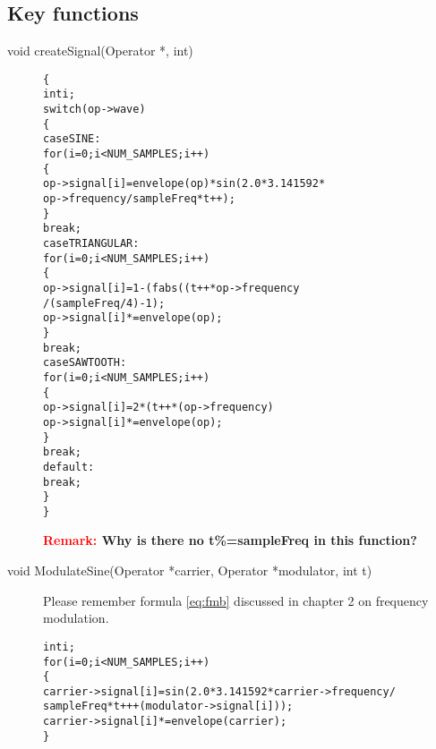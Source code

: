 \subsection{Key functions}
\begin{description}
\item[void createSignal(Operator *, int)] \label{code:createSignal}
\begin{alltt}
\{
	   int i;
	   switch(op->wave)
	   \{	
	   case SINE:
		      for(i=0; i<NUM_SAMPLES; i++)
		      \{
	            op->signal[i] = envelope(op) * sin( 2.0 * 3.141592 * 
	      		   				          op->frequency / sampleFreq * t++ );
		      \}
		      break;
	   case TRIANGULAR:
		      for(i=0; i<NUM_SAMPLES; i++)
		      \{
	            op->signal[i] = 1-(fabs((t++*op->frequency%sampleFreq)-sampleFreq/2)
	                         / (sampleFreq/4)  - 1 );
	            op->signal[i] *= envelope(op);
		      \}
		      break;
	   case SAWTOOTH:
		      for(i=0; i<NUM_SAMPLES; i++)
		      \{
	            op->signal[i] = 2*( t++*(op->frequency)%sampleFreq )/sampleFreq - 1;
	            op->signal[i] *= envelope(op);
		      \}
		      break;		
	   default:
		      break;
	   \}		
\}

\end{alltt}

\textbf{\textcolor{red}{Remark:} Why is there no t\%=sampleFreq in this function?} \\ 
\item[void ModulateSine(Operator *carrier, Operator *modulator, int t)] Please remember formula \ref{eq:fmb} discussed in chapter 2 on frequency modulation. 
\begin{alltt}
   int i;
   for(i=0; i<NUM_SAMPLES; i++)
   \{
      carrier->signal[i] = sin( 2.0 * 3.141592 * carrier->frequency / 
             						     sampleFreq * t++ + (modulator->signal[i]) );
      carrier->signal[i] *= envelope(carrier);
   \}
\end{alltt}
\end{description}
